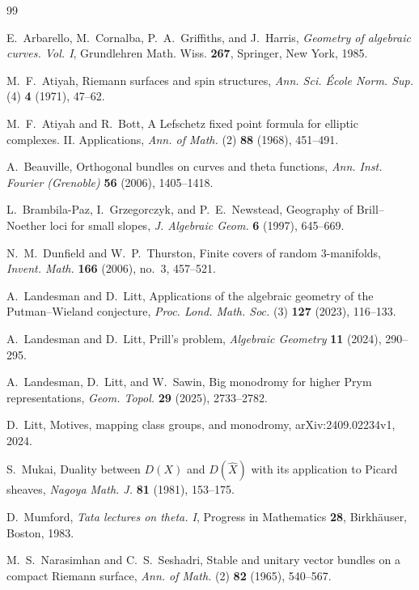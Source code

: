 \documentclass[11pt,reqno]{amsart}
\numberwithin{equation}{section}
\theoremstyle{remark}
\begin{document}
\begin{thebibliography}{99}
\small

E.~Arbarello, M.~Cornalba, P.~A.~Griffiths, and J.~Harris,
\emph{Geometry of algebraic curves. Vol. I},
Grundlehren Math. Wiss. \textbf{267}, Springer, New York, 1985.

M.~F.~Atiyah,
Riemann surfaces and spin structures,
\emph{Ann. Sci. \'Ecole Norm. Sup.} (4) \textbf{4} (1971), 47--62.

M.~F.~Atiyah and R.~Bott,
A Lefschetz fixed point formula for elliptic complexes. II.
Applications,
\emph{Ann. of Math.} (2) \textbf{88} (1968), 451--491.

A.~Beauville,
Orthogonal bundles on curves and theta functions,
\emph{Ann. Inst. Fourier (Grenoble)} \textbf{56} (2006), 1405--1418.

L.~Brambila-Paz, I.~Grzegorczyk, and P.~E.~Newstead,
Geography of Brill--Noether loci for small slopes,
\emph{J. Algebraic Geom.} \textbf{6} (1997), 645--669.

N.~M.~Dunfield and W.~P.~Thurston,
Finite covers of random \(3\)-manifolds,
\emph{Invent. Math.} \textbf{166} (2006), no.~3, 457--521.

A.~Landesman and D.~Litt,
Applications of the algebraic geometry of the Putman--Wieland
conjecture,
\emph{Proc. Lond. Math. Soc.} (3) \textbf{127} (2023), 116--133.

A.~Landesman and D.~Litt,
Prill's problem,
\emph{Algebraic Geometry} \textbf{11} (2024), 290--295.

A.~Landesman, D.~Litt, and W.~Sawin,
Big monodromy for higher Prym representations,
\emph{Geom. Topol.} \textbf{29} (2025), 2733--2782.

D.~Litt,
Motives, mapping class groups, and monodromy,
arXiv:2409.02234v1, 2024.

S.~Mukai,
Duality between \(D(X)\) and \(D(\widehat X)\) with its application to
Picard sheaves,
\emph{Nagoya Math. J.} \textbf{81} (1981), 153--175.

D.~Mumford,
\emph{Tata lectures on theta. I},
Progress in Mathematics \textbf{28}, Birkh\"auser, Boston, 1983.

M.~S.~Narasimhan and C.~S.~Seshadri,
Stable and unitary vector bundles on a compact Riemann surface,
\emph{Ann. of Math.} (2) \textbf{82} (1965), 540--567.


\end{thebibliography}
\end{document}

